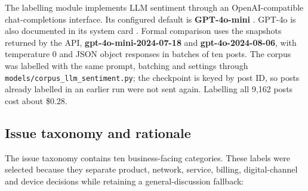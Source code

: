 \documentclass[11pt,a4paper]{article}
\begin{document}
The labelling module implements LLM sentiment through an OpenAI-compatible chat-completions interface. Its configured default is \textbf{GPT-4o-mini} \cite{openai2024gpt4omini}. GPT-4o is also documented in its system card \cite{openai2024gpt4o}. Formal comparison uses the snapshots returned by the API, \textbf{gpt-4o-mini-2024-07-18} and \textbf{gpt-4o-2024-08-06}, with temperature 0 and JSON object responses in batches of ten posts. The corpus was labelled with the same prompt, batching and settings through \texttt{models/corpus\_llm\_sentiment.py}; the checkpoint is keyed by post ID, so posts already labelled in an earlier run were not sent again. Labelling all 9,162 posts cost about \$0.28.

\subsection{Issue taxonomy and rationale}

The issue taxonomy contains ten business-facing categories. These labels were selected because they separate product, network, service, billing, digital-channel and device decisions while retaining a general-discussion fallback:
\end{document}
